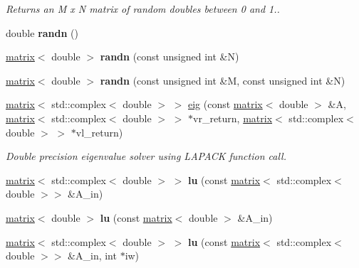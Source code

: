 \begin{DoxyCompactItemize}
\begin{DoxyCompactList}\small\item\em Returns an M x N matrix of random doubles between 0 and 1.. \end{DoxyCompactList}\item 
\hypertarget{namespacekeycpp_abbb4c27d8c550f3a522dcd4334986161}{double {\bfseries randn} ()}\label{namespacekeycpp_abbb4c27d8c550f3a522dcd4334986161}

\item 
\hypertarget{namespacekeycpp_ab55434470472a4b6c511e5a713a4d654}{\hyperlink{classkeycpp_1_1matrix}{matrix}$<$ double $>$ {\bfseries randn} (const unsigned int \&N)}\label{namespacekeycpp_ab55434470472a4b6c511e5a713a4d654}

\item 
\hypertarget{namespacekeycpp_a43bbf0f2c5e3c68a4e03abcce5aa63da}{\hyperlink{classkeycpp_1_1matrix}{matrix}$<$ double $>$ {\bfseries randn} (const unsigned int \&M, const unsigned int \&N)}\label{namespacekeycpp_a43bbf0f2c5e3c68a4e03abcce5aa63da}

\item 
\hyperlink{classkeycpp_1_1matrix}{matrix}$<$ std\-::complex$<$ double $>$ $>$ \hyperlink{namespacekeycpp_a11eb4ea6f5e22409e718cfd24de6c17a}{eig} (const \hyperlink{classkeycpp_1_1matrix}{matrix}$<$ double $>$ \&A, \hyperlink{classkeycpp_1_1matrix}{matrix}$<$ std\-::complex$<$ double $>$ $>$ $\ast$vr\-\_\-return, \hyperlink{classkeycpp_1_1matrix}{matrix}$<$ std\-::complex$<$ double $>$ $>$ $\ast$vl\-\_\-return)
\begin{DoxyCompactList}\small\item\em Double precision eigenvalue solver using L\-A\-P\-A\-C\-K function call. \end{DoxyCompactList}\item 
\hypertarget{namespacekeycpp_a5fa715d09dd31ec18be5cd455c216faa}{\hyperlink{classkeycpp_1_1matrix}{matrix}$<$ std\-::complex$<$ double $>$ $>$ {\bfseries lu} (const \hyperlink{classkeycpp_1_1matrix}{matrix}$<$ std\-::complex$<$ double $>$$>$ \&A\-\_\-in)}\label{namespacekeycpp_a5fa715d09dd31ec18be5cd455c216faa}

\item 
\hypertarget{namespacekeycpp_ac6e9ba154bce04912b775584590b4815}{\hyperlink{classkeycpp_1_1matrix}{matrix}$<$ double $>$ {\bfseries lu} (const \hyperlink{classkeycpp_1_1matrix}{matrix}$<$ double $>$ \&A\-\_\-in)}\label{namespacekeycpp_ac6e9ba154bce04912b775584590b4815}

\item 
\hypertarget{namespacekeycpp_a870bd38d5e2dbf79da93073b9d2d5d9e}{\hyperlink{classkeycpp_1_1matrix}{matrix}$<$ std\-::complex$<$ double $>$ $>$ {\bfseries lu} (const \hyperlink{classkeycpp_1_1matrix}{matrix}$<$ std\-::complex$<$ double $>$$>$ \&A\-\_\-in, int $\ast$iw)}\label{namespacekeycpp_a870bd38d5e2dbf79da93073b9d2d5d9e}


\end{DoxyCompactItemize}
